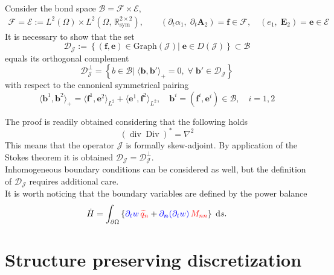 \documentclass[aspectratio=169]{ISAE-Beamer}
\DeclareMathOperator*{\Div}{Div}
\renewcommand{\div}{\operatorname{div}}
\begin{document}
\begin{frame}{}
Consider the bond space $\mathcal{B} = \mathcal{F} \times \mathcal{E}$,
\begin{equation*}
\begin{aligned}
\mathcal{F} = \mathcal{E} := L^2(\Omega) \times L^2(\Omega, \, \mathbb{R}^{2 \times 2}_{\text{sym}}), \qquad (\partial_t \alpha_1, \; \partial_t \bm{A}_2) = \bm{f} \in \mathcal{F}, \quad
(e_1, \; \bm{E}_2) = \bm{e} \in \mathcal{E}
\end{aligned} 
\end{equation*}
It is necessary to show that the set 
\[
\mathcal{D}_{\mathcal{J}} := \left\{ (\bm{f}, \bm{e}) \in \text{Graph}(\mathcal{J} ) \vert \; \bm{e} \in D(\mathcal{J})  \right\} \subset \mathcal{B}
\] 
equals its orthogonal complement
\[\mathcal{D}_{\mathcal{J}}^\perp = \left\{ b \in \mathcal{B} \vert \;  \langle \bm{b}, \bm{b}' \rangle_{+} = 0, \; \forall \; \bm{b}' \in \mathcal{D}_{\mathcal{J}} \right\} \]
with respect to the canonical symmetrical pairing 
\[
\langle \bm{b}^1, \bm{b}^2 \rangle_{+} = \langle \bm{f}^1, \bm{e}^2 \rangle_{L^2} + \langle \bm{e}^1, \bm{f}^2 \rangle_{L^2}, \quad \bm{b}^i = (\bm{f}^i, \bm{e}^i) \in \mathcal{B}, \quad i= 1,2
\]
\end{frame}

\begin{frame}{}
	The proof is readily obtained considering that the following holds
	\[ (\div \Div)^* = \nabla^2\]
	This means that the operator $\mathcal{J}$ is formally skew-adjoint. By application of the Stokes theorem it is obtained $\mathcal{D}_{\mathcal{J}} = \mathcal{D}_{\mathcal{J}}^\perp$. \\
	\vspace{.5cm}
	 Inhomogeneous boundary conditions can be considered as well, but the definition of $\mathcal{D}_{\mathcal{J}}$ requires additional care. \\
	\vspace{.5cm}
	It is worth noticing that the boundary variables are defined by the power balance
	\[
	\dot{H} = \int_{\partial \Omega} \left\{ \textcolor{blue}{\partial_t w} \, \textcolor{red}{\widetilde{q}_n} + \textcolor{blue}{\partial_{\bm{n}} (\partial_t w)} \, \textcolor{red}{M_{nn}} \right\}  \d{s}.
	\]
	
\end{frame}

\section{Structure preserving discretization}
\end{document}
